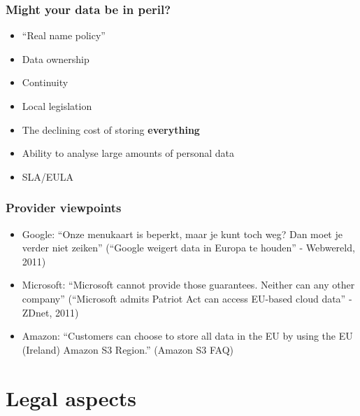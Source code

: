 \documentclass{beamer}
\begin{document}
\begin{frame}
    \frametitle{Might your data be in peril?}
    \begin{itemize}
      \item ``Real name policy''
      \item Data ownership
      \item Continuity
      \item Local legislation %
      \item The declining cost of storing \textbf{everything}
      \item Ability to analyse large amounts of personal data
      \item SLA/EULA
    \end{itemize}
\end{frame}

\begin{frame}
    \frametitle{Provider viewpoints}
    \begin{itemize}
    \item Google: ``Onze menukaart is beperkt, maar je kunt toch weg? Dan moet
        je verder niet zeiken'' (``Google weigert data in Europa te houden'' -
        Webwereld, 2011)
    \item Microsoft: ``Microsoft cannot provide those guarantees. Neither can
        any other company'' (``Microsoft admits Patriot Act can access EU-based
        cloud data'' - ZDnet, 2011)
    \item Amazon: ``Customers can choose to store all data in the EU by using
        the EU (Ireland) Amazon S3 Region.'' (Amazon S3 FAQ)
    \end{itemize}
\end{frame}


\section{Legal aspects}
\end{document}
